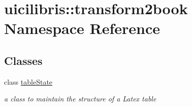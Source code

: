 \hypertarget{namespaceuicilibris_1_1transform2book}{\section{uicilibris\-:\-:transform2book \-Namespace \-Reference}
\label{namespaceuicilibris_1_1transform2book}
}
\subsection*{\-Classes}
\begin{DoxyCompactItemize}
\item 
class \hyperlink{classuicilibris_1_1transform2book_1_1tableState}{table\-State}
\begin{DoxyCompactList}\small\item\em a class to maintain the structure of a \-Latex table \end{DoxyCompactList}\end{DoxyCompactItemize}
